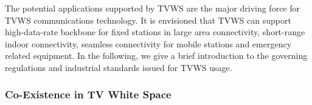 The potential applications supported by TVWS are the major driving force for TVWS communications technology.
It is envisioned that TVWS can support high-data-rate backbone for fixed stations in large area connectivity, short-range indoor connectivity, seamless connectivity for mobile stations and emergency related equipment. 
In the following, we give a brief introduction to the governing regulations and industrial standards issued for TVWS usage.







\subsubsection*{Co-Existence in TV White Space}

